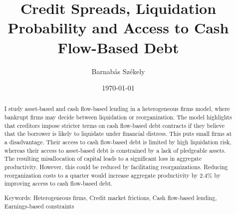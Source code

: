 \documentclass[12pt]{article}
\title{Credit Spreads, Liquidation Probability and Access to Cash Flow-Based Debt}
\date{}
\begin{document}
\author{Barnabás Székely}
\date{\today}
\vspace{-1in}

\maketitle

\begin{abstract}
\noindent

I study asset-based and cash flow-based lending in a heterogeneous firms model, where bankrupt firms may decide between liquidation or reorganization. The model highlights that creditors impose stricter terms on cash flow-based debt contracts if they believe that the borrower is likely to liquidate under financial distress. This puts small firms at a disadvantage. Their access to cash flow-based debt is limited by high liquidation risk, whereas their access to asset-based debt is constrained by a lack of pledgeable assets. The resulting misallocation of capital leads to a significant loss in aggregate productivity. However, this could be reduced by facilitating reorganizations. Reducing reorganization costs to a quarter would increase aggregate productivity by 2.4\% by improving access to cash flow-based debt.

\bigskip{}
\bigskip{}

Keywords: Heterogeneous firms, Credit market frictions, Cash flow-based lending, Earnings-based constraints

\medskip{}
\end{abstract}
\thispagestyle{empty}

\pagebreak{}
\end{document}
